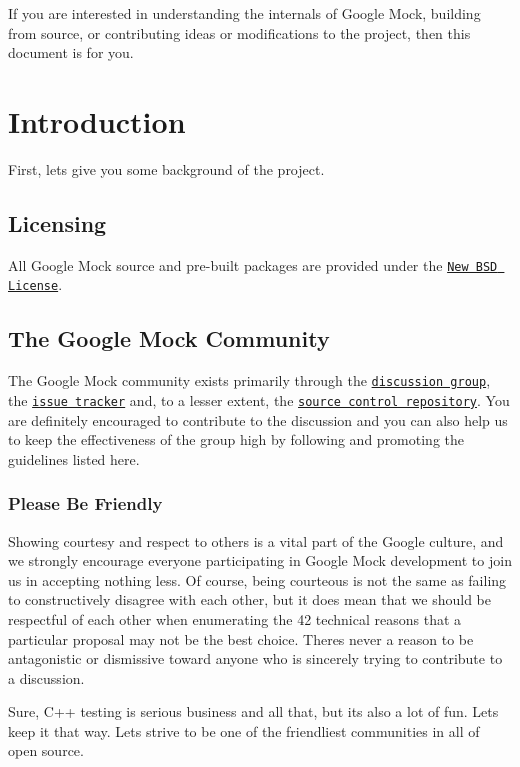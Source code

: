 If you are interested in understanding the internals of Google Mock, building from source, or contributing ideas or modifications to the project, then this document is for you.

\section*{Introduction}

First, let\textquotesingle{}s give you some background of the project.

\subsection*{Licensing}

All Google Mock source and pre-\/built packages are provided under the \href{http://www.opensource.org/licenses/bsd-license.php}{\tt New B\+SD License}.

\subsection*{The Google Mock Community}

The Google Mock community exists primarily through the \href{http://groups.google.com/group/googlemock}{\tt discussion group}, the \href{https://github.com/google/googletest/issues}{\tt issue tracker} and, to a lesser extent, the \href{../}{\tt source control repository}. You are definitely encouraged to contribute to the discussion and you can also help us to keep the effectiveness of the group high by following and promoting the guidelines listed here.

\subsubsection*{Please Be Friendly}

Showing courtesy and respect to others is a vital part of the Google culture, and we strongly encourage everyone participating in Google Mock development to join us in accepting nothing less. Of course, being courteous is not the same as failing to constructively disagree with each other, but it does mean that we should be respectful of each other when enumerating the 42 technical reasons that a particular proposal may not be the best choice. There\textquotesingle{}s never a reason to be antagonistic or dismissive toward anyone who is sincerely trying to contribute to a discussion.

Sure, C++ testing is serious business and all that, but it\textquotesingle{}s also a lot of fun. Let\textquotesingle{}s keep it that way. Let\textquotesingle{}s strive to be one of the friendliest communities in all of open source.


